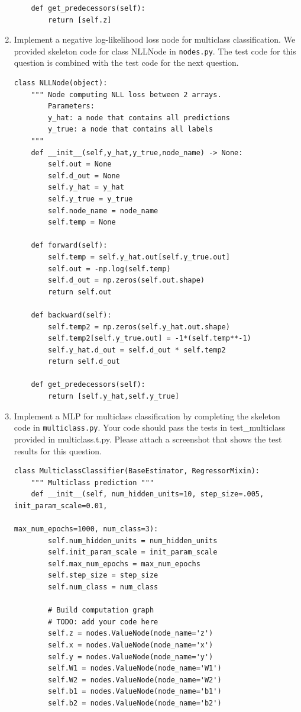 \documentclass{article}
\theoremstyle{plain}
\theoremstyle{definition}
\begin{document}
\begin{enumerate}
\begin{verbatim}
    def get_predecessors(self):
        return [self.z]
\end{verbatim}

\item Implement a negative log-likelihood loss node for multiclass
classification. We provided skeleton code for class NLLNode in \texttt{nodes.py}. The test code for this question is combined with the test code for the next question.

\subitem
\begin{verbatim}
class NLLNode(object):
    """ Node computing NLL loss between 2 arrays.
        Parameters:
        y_hat: a node that contains all predictions
        y_true: a node that contains all labels
    """
    def __init__(self,y_hat,y_true,node_name) -> None:
        self.out = None
        self.d_out = None
        self.y_hat = y_hat
        self.y_true = y_true
        self.node_name = node_name
        self.temp = None
        
    def forward(self):    
        self.temp = self.y_hat.out[self.y_true.out]
        self.out = -np.log(self.temp)
        self.d_out = np.zeros(self.out.shape)
        return self.out

    def backward(self):
        self.temp2 = np.zeros(self.y_hat.out.shape)
        self.temp2[self.y_true.out] = -1*(self.temp**-1)
        self.y_hat.d_out = self.d_out * self.temp2
        return self.d_out

    def get_predecessors(self):
        return [self.y_hat,self.y_true]
\end{verbatim}
\item Implement a MLP for multiclass classification by completing the skeleton code in \texttt{multiclass.py}. Your code should pass the tests in test\_multiclass provided in multiclass.t.py. Please attach a screenshot that shows the test results for this question.

\subitem
\begin{verbatim}
class MulticlassClassifier(BaseEstimator, RegressorMixin):
    """ Multiclass prediction """
    def __init__(self, num_hidden_units=10, step_size=.005, init_param_scale=0.01, 
                                                max_num_epochs=1000, num_class=3):
        self.num_hidden_units = num_hidden_units
        self.init_param_scale = init_param_scale
        self.max_num_epochs = max_num_epochs
        self.step_size = step_size
        self.num_class = num_class

        # Build computation graph
        # TODO: add your code here
        self.z = nodes.ValueNode(node_name='z')
        self.x = nodes.ValueNode(node_name='x')
        self.y = nodes.ValueNode(node_name='y')
        self.W1 = nodes.ValueNode(node_name='W1')
        self.W2 = nodes.ValueNode(node_name='W2')
        self.b1 = nodes.ValueNode(node_name='b1')
        self.b2 = nodes.ValueNode(node_name='b2')


\end{verbatim}
\end{enumerate}
\end{document}
